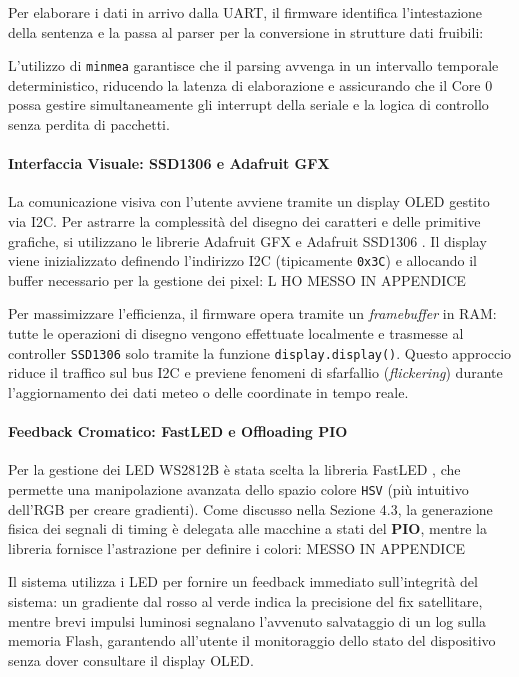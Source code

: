 Per elaborare i dati in arrivo dalla UART, il firmware identifica l'intestazione della sentenza e la passa al parser per la conversione in strutture dati fruibili:


L'utilizzo di \texttt{minmea} garantisce che il parsing avvenga in un intervallo temporale deterministico, riducendo la latenza di elaborazione e assicurando che il Core 0 possa gestire simultaneamente gli interrupt della seriale e la logica di controllo senza perdita di pacchetti.

\paragraph{Interfaccia Visuale: SSD1306 e Adafruit GFX}

La comunicazione visiva con l'utente avviene tramite un display OLED gestito via I2C. Per astrarre la complessità del disegno dei caratteri e delle primitive grafiche, si utilizzano le librerie Adafruit GFX \cite{adafruit_gfx} e Adafruit SSD1306 \cite{adafruit_ssd1306}. Il display viene inizializzato definendo l'indirizzo I2C (tipicamente \texttt{0x3C}) e allocando il buffer necessario per la gestione dei pixel: L HO MESSO IN APPENDICE

Per massimizzare l'efficienza, il firmware opera tramite un \textit{framebuffer} in RAM: tutte le operazioni di disegno vengono effettuate localmente e trasmesse al controller \texttt{SSD1306} solo tramite la funzione \texttt{display.display()}. Questo approccio riduce il traffico sul bus I2C e previene fenomeni di sfarfallio (\textit{flickering}) durante l'aggiornamento dei dati meteo o delle coordinate in tempo reale.

\paragraph{Feedback Cromatico: FastLED e Offloading PIO}

Per la gestione dei LED WS2812B è stata scelta la libreria FastLED \cite{fastled_lib}, che permette una manipolazione avanzata dello spazio colore \texttt{HSV} (più intuitivo dell'RGB per creare gradienti). Come discusso nella Sezione 4.3, la generazione fisica dei segnali di timing è delegata alle macchine a stati del \textbf{PIO}, mentre la libreria fornisce l'astrazione per definire i colori: MESSO IN APPENDICE

Il sistema utilizza i LED per fornire un feedback immediato sull'integrità del sistema: un gradiente dal rosso al verde indica la precisione del fix satellitare, mentre brevi impulsi luminosi segnalano l'avvenuto salvataggio di un log sulla memoria Flash, garantendo all'utente il monitoraggio dello stato del dispositivo senza dover consultare il display OLED.

